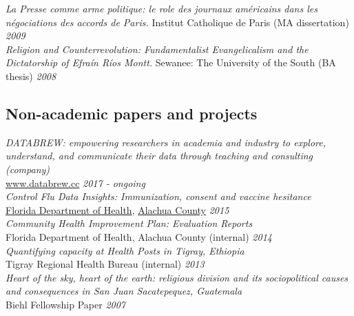 \documentclass[11pt]{article}
\begin{document}
\noindent \emph{La Presse comme arme politique: le role des journaux américains dans les négociations des accords de Paris.} Institut Catholique de Paris (MA dissertation) \hfill \emph{2009}\\

\noindent \emph{Religion and Counterrevolution: Fundamentalist Evangelicalism and the Dictatorship of Efraín Ríos Montt.} Sewanee: The University of the South (BA thesis) \hfill \emph{2008}\\

\subsection*{Non-academic papers and projects}

\noindent \emph{DATABREW: empowering researchers in academia and industry to explore, understand,
and communicate their data through teaching and consulting (company)}\\
\href{www.databrew.cc}{www.databrew.cc} \hfill \emph{2017 - ongoing}\\


\noindent \emph{Control Flu Data Insights: Immunization, consent and vaccine hesitance}\\ \href{http://economicsofmalaria.com/pdfs/estimating.pdf}{Florida Department of Health}, \href{http://economicsofmalaria.com/pdfs/targeting.pdf}{Alachua County} \hfill \emph{2015}\\

\noindent \emph{Community Health Improvement Plan: Evaluation Reports} \\ Florida Department of Health, Alachua County (internal) \hfill \emph{2014}\\

\noindent \emph{Quantifying capacity at Health Posts in Tigray, Ethiopia} \\ Tigray Regional Health Bureau (internal) \hfill \emph{2013}\\


\noindent \emph{Heart of the sky, heart of the earth: religious division and its sociopolitical causes and consequences in San Juan Sacatepequez, Guatemala} \\ Biehl Fellowship Paper \hfill \emph{2007}\\
\end{document}
